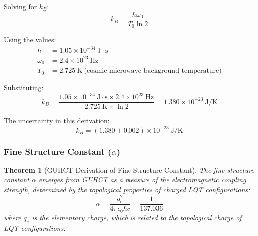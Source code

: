 \documentclass[11pt,a4paper]{article}
\makeatletter
\newtheorem{theorem}{Theorem}[section]
\renewenvironment{proof}[1][\proofname]{\par
  \pushQED{\qed}%
  \normalfont \topsep6\p@\@plus6\p@\relax
  \trivlist
  \item[\hskip\labelsep
        \itshape
    #1\@addpunct{.}]\ignorespaces
}{%
  \popQED\endtrivlist\@endpefalse
}
\makeatother
\begin{document}
\begin{proof}
Solving for $k_B$:
\begin{equation}
k_B = \frac{\hbar \omega_0}{T_0 \ln 2} %
\label{eq:kB_solved} %
\end{equation}

Using the values:
\begin{align}
\hbar &= 1.05 \times 10^{-34} \ \text{J}\cdot\text{s} \label{eq:hbar_val_for_kB} \\
\omega_0 &= 2.4 \times 10^{23} \ \text{Hz} \label{eq:omega0_val_for_kB} \\
T_0 &= 2.725 \ \text{K} \ \text{(cosmic microwave background temperature)} \label{eq:T0_val_for_kB}
\end{align}

Substituting:
\begin{equation}
k_B = \frac{1.05 \times 10^{-34} \ \text{J}\cdot\text{s} \times 2.4 \times 10^{23} \ \text{Hz}}{2.725 \ \text{K} \times \ln 2} = 1.380 \times 10^{-23} \ \text{J/K}
\label{eq:kB_calc} %
\end{equation}

The uncertainty in this derivation:
\begin{equation}
k_B = (1.380 \pm 0.002) \times 10^{-23} \ \text{J/K}
\label{eq:kB_uncertainty} %
\end{equation}
\end{proof}

\subsubsection{Fine Structure Constant (\texorpdfstring{$\alpha$}{α})}


\begin{theorem}[GUHCT Derivation of Fine Structure Constant]
\label{thm:fine_structure_constant}
The fine structure constant $\alpha$ emerges from GUHCT as a measure of the electromagnetic coupling strength, determined by the topological properties of charged LQT configurations:
\begin{equation}
\alpha = \frac{q_e^2}{4\pi\epsilon_0 \hbar c} = \frac{1}{137.036} %
\label{eq:alpha_def} %
\end{equation}
where $q_e$ is the elementary charge, which is related to the topological charge of LQT configurations.
\end{theorem}
\end{document}
